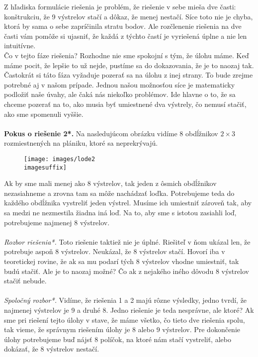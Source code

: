 {Z hľadiska formulácie riešenia je problém, že riešenie v sebe mieša dve časti: konštrukciu, že 9 výstrelov stačí a dôkaz, že menej nestačí. Síce toto nie je chyba, ktorá by sama o sebe zapríčinila stratu bodov. Ale rozčlenenie riešenia na dve časti vám pomôže si ujasniť, že každá z týchto častí je vyriešená úplne a nie len intuitívne.\\

Čo v tejto fáze riešenia? Rozhodne nie sme spokojní s tým, že úlohu máme. Keď máme pocit, že lepšie to už nejde, pustíme sa do dokazovania, že je to naozaj tak. Častokrát si táto fáza vyžaduje pozerať sa na úlohu z inej strany. To bude zrejme potrebné aj v našom prípade. Jednou našou možnosťou síce je matematicky podložiť naše úvahy, ale čaká nás niekoľko problémov. Ide hlavne o to, že sa chceme pozerať na to, ako musia byť umiestnené dva výstrely, čo nemusí stačiť, ako sme spomenuli vyššie.\\
\\
\textbf{Pokus o riešenie 2*.} Na nasledujúcom obrázku vidíme 8 obdĺžnikov $2\times3$ rozmiestnených na plániku, ktoré sa neprekrývajú.

\begin{figure}[h]
    \centering
    \texttt{[image: images/lode2\\imagesuffix]}
    \caption{}
    \label{fig:lode2}
\end{figure}

Ak by sme mali menej ako 8 výstrelov, tak jeden z ôsmich obdĺžnikov nezasiahneme a zrovna tam sa môže nachádzať loďka. Potrebujeme teda do každého obdĺžnika vystreliť jeden výstrel. Musíme ich umiestniť zároveň tak, aby sa medzi ne nezmestila žiadna iná loď. Na to, aby sme s istotou zasiahli loď, potrebujeme najmenej 8 výstrelov.\\
\\
\textit{Rozbor riešenia*.} Toto riešenie taktiež nie je úplné. Riešiteľ v ňom ukázal len, že potrebuje aspoň 8 výstrelov. Neukázal, že 8 výstrelov stačí. Hovorí iba v teoretickej rovine, že ak sa mu podarí tých 8 výstrelov vhodne umiestniť, tak budú stačiť. Ale je to naozaj možné? Čo ak z nejakého iného dôvodu 8 výstrelov stačiť nebude.\\
\\
\textit{Spoločný rozbor*.} Vidíme, že riešenia 1 a 2 majú rôzne výsledky, jedno tvrdí, že najmenej výstrelov je 9 a druhé 8. Jedno riešenie je teda nesprávne, ale ktoré? Ak sme pri riešení tejto úlohy v stave, že máme všetko, čo tieto dve riešenia spolu, tak vieme, že správnym riešením úlohy je 8 alebo 9 výstrelov. Pre dokončenie úlohy potrebujeme buď nájsť 8 políčok, na ktoré nám stačí vystreliť, alebo dokázať, že 8 výstrelov nestačí.

}
